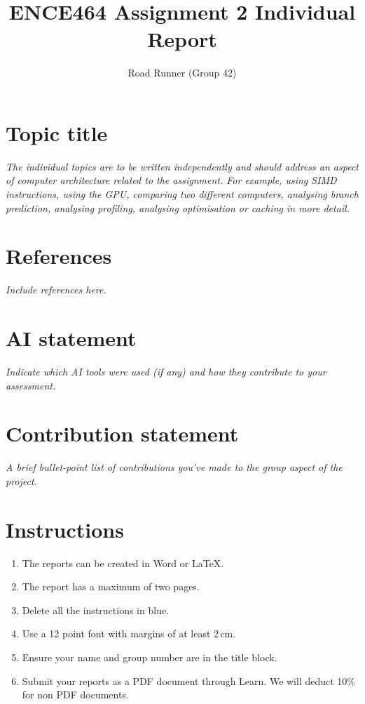 \documentclass[a4paper,12pt]{article}
\title{ENCE464 Assignment 2 Individual Report}
\author{Road Runner (Group 42)}
\date{}
\newcommand{\comment}[1]{\emph{\color{blue}#1}}
\begin{document}
\maketitle

\section{Topic title}

\comment{The individual topics are to be written independently and
  should address an aspect of computer architecture related to the
  assignment.  For example, using SIMD instructions, using the GPU,
  comparing two different computers, analysing branch prediction,
  analysing profiling, analysing optimisation or caching in more detail.}

\section{References}

\comment{Include references here.}

\section{AI statement}

\comment{Indicate which AI tools were used (if any) and how they
  contribute to your assessment.}

\section{Contribution statement}

\comment{A brief bullet-point list of contributions you've made to the
  group aspect of the project.}


\color{blue}
\section*{Instructions}

\begin{enumerate}
\item The reports can be created in Word or \LaTeX.

\item The report has a maximum of two pages.

\item Delete all the instructions in blue.

\item Use a 12 point font with margins of at least 2\,cm.

\item Ensure your name and group number are in the title block.

\item Submit your reports as a PDF document through Learn.  We will
  deduct 10\% for non PDF documents.

\end{enumerate}
\end{document}

